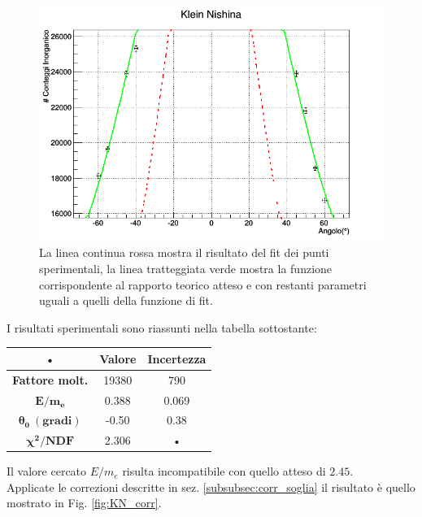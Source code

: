 \documentclass[8pt]{extarticle}
\begin{document}
\begin{figure}
\begin{center}
\includegraphics[scale=0.5]{klein_nishina_nocorr_conf}
\caption{La linea continua rossa mostra il risultato del fit dei punti sperimentali, la linea tratteggiata verde mostra la funzione corrispondente al rapporto teorico atteso e con restanti parametri uguali a quelli della funzione di fit.}
\label{KN_nocorr}
\end{center}
\end{figure}

I risultati sperimentali sono riassunti nella tabella sottostante: \\
\begin{center}
\begin{tabular}{|c|c|c|}
\hline 
• & \textbf{Valore} & \textbf{Incertezza} \\ 
\hline 
\textbf{Fattore molt.} & 19380 & 790 \\ 
\hline 
$\mathbf{E/m_e}$ & 0.388 & 0.069 \\ 
\hline 
$\mathbf{\theta_0\ (gradi)}$ & -0.50 & 0.38 \\ 
\hline 
$\mathbf{\chi^2/NDF}$ & 2.306 & • \\ 
\hline 
\end{tabular} 
\end{center}

Il valore cercato $E/m_e$ risulta incompatibile con quello atteso di $2.45$. \\

Applicate le correzioni descritte in sez. \ref{subsubsec:corr_soglia} il risultato è quello mostrato in Fig. \ref{fig:KN_corr}. \\
\end{document}
